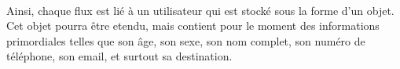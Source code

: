 \paragraph*{}
Ainsi, chaque flux est lié à un utilisateur qui est stocké sous la forme d'un objet. 
Cet objet pourra être etendu, mais contient pour le moment des informations primordiales telles que son âge, son sexe, son nom complet, son numéro de téléphone, son email, et surtout sa destination.



